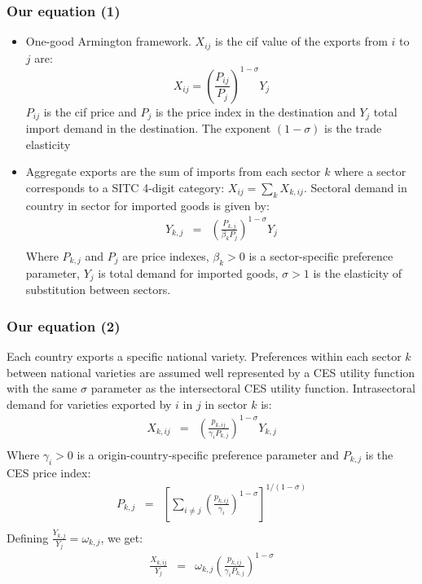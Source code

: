 \documentclass{beamer}
\begin{document}
\begin{frame}[plain]\frametitle{Our equation (1)}
\begin{itemize}
	\item One-good Armington framework. ${X}_{ij}$ is the cif value of the exports from $i$ to $j$ are:
	\[{{X}_{ij}}={{\left( \frac{{{P}_{ij}}}{{{P}_{j}}} \right)}^{1-\sigma}}{{Y}_{j}}\]
	${{P}_{ij}}$ is the cif price and ${{P}_{j}}$ is the price index in the destination and ${{Y}_{j}}$ total import demand in the destination.
	The exponent $\left( 1-\sigma \right)$ is the trade elasticity
	\item Aggregate exports are the sum of imports from each sector $k$ where a sector corresponds to a SITC 4-digit category: ${{X}_{ij}}=\sum\limits_{k}{{{X}_{k,ij}}}$.
	Sectoral demand in country  in sector  for imported goods is given by: 
	\[\begin{array}{*{35}{l}}
	{{Y}_{k,j}} & = & {{\left( \frac{{{P}_{k,j}}}{{{\beta }_{k}}{{P}_{j}}} \right)}^{1-\sigma }}{{Y}_{j}}  \\
	\end{array}\]
	Where ${{P}_{k,j}}$ and ${{P}_{j}}$ are price indexes, ${{\beta }_{k}}>0$ is a sector-specific preference parameter, ${{Y}_{j}}$ is total demand for imported goods, $\sigma >1$ is the elasticity of substitution between sectors.
\end{itemize}
\end{frame}



\begin{frame}[plain]\frametitle{Our equation (2)}

Each country exports a specific national variety.
Preferences within each sector $k$ between national varieties are assumed well represented by a CES utility function with the same $\sigma $ parameter as the intersectoral CES utility function.
Intrasectoral demand for varieties exported by $i$ in $j$ in sector $k$ is: 
\[\begin{array}{*{35}{l}}
{{X}_{k,ij}} & = & {{\left( \frac{{{p}_{k,ij}}}{{{\gamma }_{i}}{{P}_{k,j}}} \right)}^{1-\sigma }}{{Y}_{k,j}}  \\
\end{array}\]
Where ${{\gamma }_{i}}>0$ is a origin-country-specific preference parameter and ${{P}_{k,j}}$ is the CES price index:
\[\begin{array}{*{35}{l}}
{{P}_{k,j}} & = & {{\left[ \sum\limits_{i\ne j}{{{\left( \frac{{{p}_{k,ij}}}{{{\gamma }_{i}}} \right)}^{1-\sigma }}} \right]}^{1/(1-\sigma )}}  \\
\end{array}\]
Defining $\frac{{{Y}_{k,j}}}{{{Y}_{j}}}={{\omega }_{k,j}}$, we get: 
\[\begin{array}{*{35}{l}}
\frac{{{X}_{k,ij}}}{{{Y}_{j}}} & = & {{\omega }_{k,j}}{{\left( \frac{{{p}_{k,ij}}}{{{\gamma }_{i}}{{P}_{k,j}}} \right)}^{1-\sigma }}  \\
\end{array}\]

\end{frame}
\end{document}
